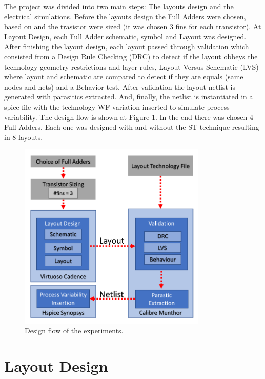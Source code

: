 \documentclass[ecp,tc, english]{iiufrgs}
\begin{document}
The project was divided into two main steps: The layouts design and the electrical simulations. Before the layouts design the Full Adders were chosen, based on \cite{dokania2015circuit} and the trasistor were sized (it was chosen 3 fins for each transistor). At Layout Design, each Full Adder schematic, symbol and Layout was designed. After finishing the layout design, each layout passed through validation which consisted from a Design Rule Checking (DRC) to detect if the layout obbeys the technology geometry restrictions and layer rules, Layout Versus Schematic (LVS) where layout and schematic are compared to detect if they are equals (same nodes and nets) and a Behavior test. After validation the layout netlist is generated with parasitics extracted. And, finally, the netlist is instantiated in a spice file with the technology WF variation inserted to simulate process variability. The design flow is shown at Figure \ref{DesignFlow}. In the end there was chosen 4 Full Adders. Each one was designed with and without the ST technique resulting in 8 layouts.

\begin{figure}[H]
\centering
\includegraphics[width=0.8\textwidth]{DesignFlow.pdf}
\caption{Design flow of the experiments.}
\label{DesignFlow}
\end{figure}

\section{Layout Design}
\end{document}
